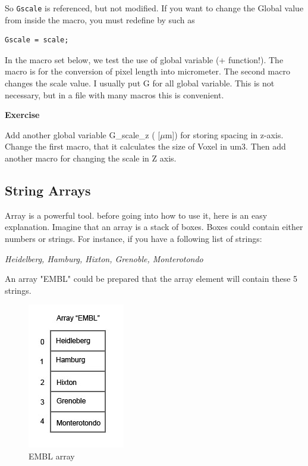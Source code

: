 \documentclass[11pt,a4paper,oneside]{report}
\newenvironment{indentexercise}[1]%
{{\setlength{\leftmargin}{2em}}%
\textbf{Exercise \thesubsection-#1}%
\begin{list}{}%
	\item%
}
{\end{list}}
\newcommand{\ilcom}[1]{\texttt{\small#1}}
\begin{document}
So \ilcom{Gscale} is referenced, but not modified. 
If you want to change the Global value from inside the macro, you must redefine by such as
\begin{lstlisting}[numbers=none]
Gscale = scale;
\end{lstlisting}
In the macro set below, we test the use of global variable (+ function!). 
The macro is for the conversion of pixel length into micrometer. 
The second macro changes the scale value. 
I usually put G for all global variable. This is not necessary, 
but in a file with many macros this is convenient.

\begin{indentexercise}{1}
Add another global variable G\_scale\_z ( [\ensuremath{\mu}m]) for storing spacing in z-axis. 
Change the first macro, that it calculates the size of Voxel in um3. 
Then add another macro for changing the scale in Z axis. 
\end{indentexercise}

\subsection{String Arrays}
Array is a powerful tool. before going into how to use it, here is an easy explanation. 
Imagine that an array is a stack of boxes. Boxes could contain either numbers or strings. 
For instance, if you have a following list of strings:

\textit{Heidelberg, Hamburg, Hixton, Grenoble, Monterotondo}

An array "EMBL" could be prepared that the array element will contain these 5 strings. 

\begin{figure}[htbp]
\begin{center}
\includegraphics[scale=0.6]{fig/fig2441_arrayScheme.jpg}
\caption{EMBL array}
\label{figEMBLarray}
\end{center}
\end{figure} 
 
\end{document}
